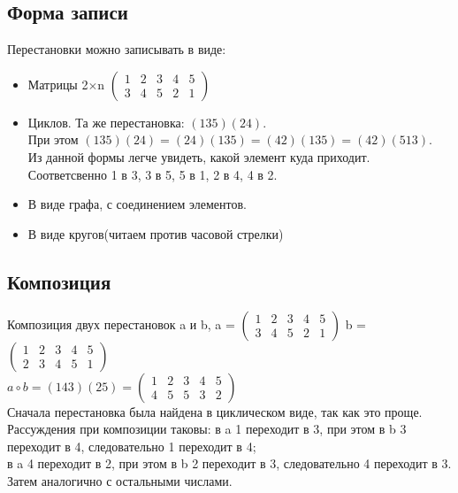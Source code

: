 \documentclass[12pt]{article}
\begin{document}
\subsection{Форма записи}
Перестановки можно записывать в виде:
\begin{itemize}
    \item Матрицы 2$\times$n
          $\begin{pmatrix}
                  1 & 2 & 3 & 4 & 5 \\
                  3 & 4 & 5 & 2 & 1
              \end{pmatrix}$
    \item Циклов. Та же перестановка:
          $(1 3 5)(2 4)$.\\ При этом $(1 3 5)(2 4) = (2 4)(1 3 5)=
              (4 2)(1 3 5)=(4 2)(5 1 3)$.\\
          Из данной формы легче увидеть, какой элемент куда приходит. Соответсвенно 1 в 3, 3 в 5, 5 в 1, 2 в 4, 4 в 2.
    \item В виде графа, с соединением элементов.
          
    \item В виде кругов(читаем против часовой стрелки)
          
\end{itemize}
\subsection{Композиция}
Композиция двух перестановок a и b,
a = $\begin{pmatrix}
        1 & 2 & 3 & 4 & 5 \\
        3 & 4 & 5 & 2 & 1
    \end{pmatrix}$
b = $\begin{pmatrix}
        1 & 2 & 3 & 4 & 5 \\
        2 & 3 & 4 & 5 & 1
    \end{pmatrix}$\\
$a \circ b= (1 4 3)(2 5)=
    \begin{pmatrix}
        1 & 2 & 3 & 4 & 5 \\
        4 & 5 & 5 & 3 & 2
    \end{pmatrix}$\\
Сначала перестановка была найдена в циклическом виде, так как это проще.\\ Рассуждения при композиции таковы: в a 1 переходит в 3, при этом в b 3 переходит в 4, следовательно 1 переходит в 4;\\в a 4 переходит в 2, при этом в b 2 переходит в 3, следовательно 4 переходит в 3. Затем аналогично с остальными числами.
\end{document}
